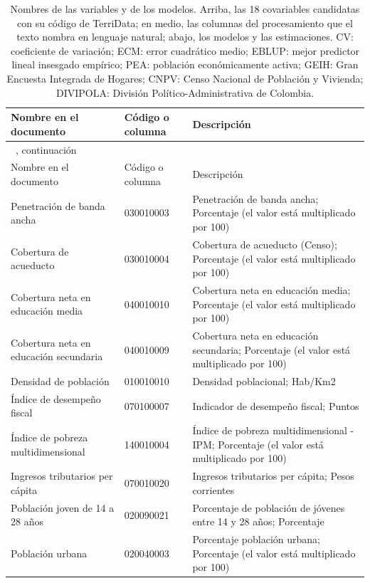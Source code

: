 {\footnotesize\setlength{\tabcolsep}{3pt}
\begin{longtable}{p{3.5cm} p{3.5cm} p{5.7cm}}
\caption[Nombres de las variables y de los modelos]{Nombres de las variables y de los modelos. Arriba, las 18 covariables candidatas con su código de TerriData; en medio, las columnas del procesamiento que el texto nombra en lenguaje natural; abajo, los modelos y las estimaciones. CV: coeficiente de variación; ECM: error cuadrático medio; EBLUP: mejor predictor lineal insesgado empírico; PEA: población económicamente activa; GEIH: Gran Encuesta Integrada de Hogares; CNPV: Censo Nacional de Población y Vivienda; DIVIPOLA: División Político-Administrativa de Colombia.}
\label{tab:app_variables} \\
\toprule
Nombre en el documento & Código o columna & Descripción \\
\midrule
\endfirsthead
\multicolumn{3}{l}{\tablename~\thetable{}, continuación} \\
\toprule
Nombre en el documento & Código o columna & Descripción \\
\midrule
\endhead
\bottomrule
\endlastfoot
Penetración de banda ancha & 030010003 & Penetración de banda ancha; Porcentaje (el valor está multiplicado por 100) \\
Cobertura de acueducto & 030010004 & Cobertura de acueducto (Censo); Porcentaje (el valor está multiplicado por 100) \\
Cobertura neta en educación media & 040010010 & Cobertura neta en educación media; Porcentaje (el valor está multiplicado por 100) \\
Cobertura neta en educación secundaria & 040010009 & Cobertura neta en educación secundaria; Porcentaje (el valor está multiplicado por 100) \\
Densidad de población & 010010010 & Densidad poblacional; Hab/Km2 \\
Índice de desempeño fiscal & 070100007 & Indicador de desempeño fiscal; Puntos \\
Índice de pobreza multidimensional & 140010004 & Índice de pobreza multidimensional - IPM; Porcentaje (el valor está multiplicado por 100) \\
Ingresos tributarios per cápita & 070010020 & Ingresos tributarios per cápita; Pesos corrientes \\
Población joven de 14 a 28 años & 020090021 & Porcentaje de población de jóvenes entre 14 y 28 años; Porcentaje \\
Población urbana & 020040003 & Porcentaje población urbana; Porcentaje (el valor está multiplicado por 100) \\

\end{longtable}}
